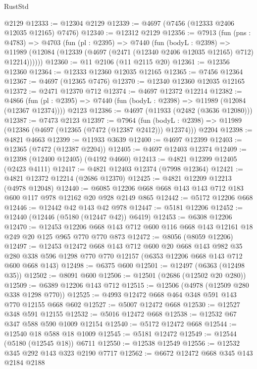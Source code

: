 \begin{lexlean}{RustStd}
\begin{coremodule}
    @2129
@12333 := @12304 @2129
@12339 := @4697 (@7456 (@12333 @2406 @12035 @12165) @7476)
@12340 := @12312 @2129
@12356 := @7913
    (fun (pns : @4783) =>
    @4703
      (fun (pl : @2395) =>
      @7440
        (fun (bodyL : @2398) =>
        @11989 (@12084 (@12339 (@4697 (@2471 (@12340 @2406 @12035 @12165) @712) @12214))))))
@12360 := @11 @2106 (@11 @2115 @20)
@12361 := @12356 @12360
@12364 := @12333 @12360 @12035 @12165
@12365 := @7456 @12364
@12367 := @4697 (@12365 @7476)
@12370 := @12340 @12360 @12035 @12165
@12372 := @2471 @12370 @712
@12374 := @4697 @12372 @12214
@12382 := @4866
    (fun (pl : @2395) => @7440 (fun (bodyL : @2398) => @11989 (@12084 (@12367 @12374))))
    @2123
@12386 := @4697 (@11933 (@2482 (@3636 @12080)))
@12387 := @7473 @2123
@12397 := @7964
    (fun (bodyL : @2398) => @11989 (@12386 (@4697 (@12365 (@7472 (@12387 @2412))) @12374)))
    @2204
@12398 := @4821 @4663
@12399 := @11933 @3639
@12400 := @4697 @12399
@12403 := @12365 (@7472 (@12387 @2204))
@12405 := @4697 @12403 @12374
@12409 := @12398 (@12400 @12405) (@4192 @4660)
@12413 := @4821 @12399 @12405 (@2423 @4111)
@12417 := @4821 @12403 @12374 (@7998 @12364)
@12421 := @4821 @12372 @12214 (@2686 @12370)
@12425 := @4821 @12209 @12213 (@4978 @12048)
@12440 := @6085 @12206 @668 @668 @143 @143 @712 @183 @600 @117 @978 @12162 @20 @928 @2149 @865
@12442 := @5172 @12206 @668
@12446 := @12442 @42 @143 @42 @978
@12447 := @5181 @12206
@12452 := @12440 (@12446 (@5180 (@12447 @42)) @6419)
@12453 := @6308 @12206
@12470 := @12453
    @12206
    @668
    @143
    @712
    @600
    @116
    @668
    @143
    @12161
    @18
    @249
    @20
    @125
    @965
    @770
    @770
    @873
@12472 := @8056 (@8059 @12206)
@12497 := @12453
    @12472
    @668
    @143
    @712
    @600
    @20
    @668
    @143
    @982
    @35
    @280
    @338
    @596
    @1298
    @770
    @770
    @12157
    (@6353 @12206 @668 @143 @712 @600 @668 @143)
@12498 := @6375 @600
@12501 := @12497 (@6363 (@12498 @35))
@12502 := @8091 @600
@12506 := @12501 (@2686 (@12502 @20 @280))
@12509 := @6389 @12206 @143 @712
@12515 := @12506 (@4978 (@12509 @280 @338 @1298 @770))
@12525 := @4993 @12472 @668 @464 @348 @591 @143 @770 @12155 @668 @602
@12527 := @5007 @12472 @668
@12530 := @12527 @348 @591 @12155
@12532 := @5016 @12472 @668
@12538 := @12532 @67 @347 @588 @590 @1009 @12154
@12540 := @5172 @12472 @668
@12544 := @12540 @18 @588 @18 @1009
@12545 := @5181 @12472
@12549 := @12544 (@5180 (@12545 @18)) @6711
@12550 := @12538 @12549
@12556 := @12532 @345 @292 @143 @323 @2190 @7717
@12562 := @6672 @12472 @668 @345 @143 @2184 @2188

\end{coremodule}
\end{lexlean}

